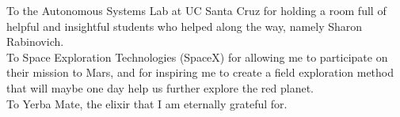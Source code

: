 
\begin{acknowledgements}

\noindent To the Autonomous Systems Lab at UC Santa Cruz for holding a room full of helpful and insightful students who helped along the way, namely Sharon Rabinovich.\\

\noindent To Space Exploration Technologies (SpaceX) for allowing me to participate on their mission to Mars, and for inspiring me to create a field exploration method that will maybe one day help us further explore the red planet.\\

\noindent To Yerba Mate, the elixir that I am eternally grateful for.\\

\end{acknowledgements}